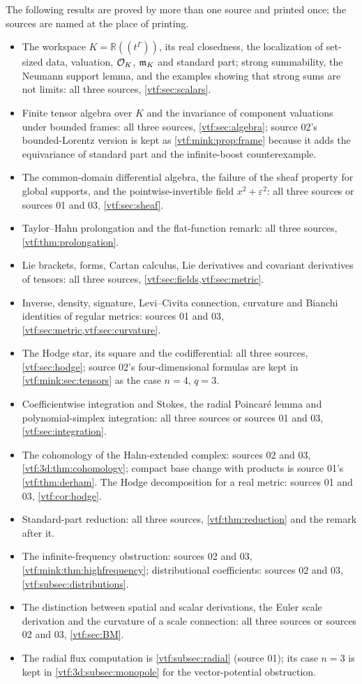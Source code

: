 \documentclass[11pt,letterpaper]{article}
\theoremstyle{definition}
\theoremstyle{remark}
\newcommand{\R}{\mathbb R}\newcommand{\C}{\mathbb C}
\newcommand{\eps}{\varepsilon}
\begin{document}
The following results are proved by more than one source and printed once; the
sources are named at the place of printing.
\begin{itemize}
\item The workspace $K=\R((t^\Gamma))$, its real closedness, the localization of
set-sized data, valuation, $\mathcal O_K$, $\mathfrak m_K$ and standard part; strong
summability, the Neumann support lemma, and the examples showing that strong
sums are not limits: all three sources, \cref{vtf:sec:scalars}.
\item Finite tensor algebra over $K$ and the invariance of component valuations
under bounded frames: all three sources, \cref{vtf:sec:algebra}; source 02's
bounded-Lorentz version is kept as \cref{vtf:mink:prop:frame} because it adds the
equivariance of standard part and the infinite-boost counterexample.
\item The common-domain differential algebra, the failure of the sheaf property
for global supports, and the pointwise-invertible field $x^2+\eps^2$: all three
sources or sources 01 and 03, \cref{vtf:sec:sheaf}.
\item Taylor--Hahn prolongation and the flat-function remark: all three sources,
\cref{vtf:thm:prolongation}.
\item Lie brackets, forms, Cartan calculus, Lie derivatives and covariant
derivatives of tensors: all three sources, \cref{vtf:sec:fields,vtf:sec:metric}.
\item Inverse, density, signature, Levi--Civita connection, curvature and
Bianchi identities of regular metrics: sources 01 and 03, \cref{vtf:sec:metric,vtf:sec:curvature}.
\item The Hodge star, its square and the codifferential: all three sources,
\cref{vtf:sec:hodge}; source 02's four-dimensional formulas are kept in
\cref{vtf:mink:sec:tensors} as the case $n=4$, $q=3$.
\item Coefficientwise integration and Stokes, the radial Poincar\'e lemma and
polynomial-simplex integration: all three sources or sources 01 and 03,
\cref{vtf:sec:integration}.
\item The cohomology of the Hahn-extended complex: sources 02 and 03,
\cref{vtf:3d:thm:cohomology}; compact base change with products is source 01's
\cref{vtf:thm:derham}. The Hodge decomposition for a real metric: sources 01
and 03, \cref{vtf:cor:hodge}.
\item Standard-part reduction: all three sources, \cref{vtf:thm:reduction} and
the remark after it.
\item The infinite-frequency obstruction: sources 02 and 03,
\cref{vtf:mink:thm:highfrequency}; distributional coefficients: sources 02 and
03, \cref{vtf:subsec:distributions}.
\item The distinction between spatial and scalar derivations, the Euler scale
derivation and the curvature of a scale connection: all three sources or sources
02 and 03, \cref{vtf:sec:BM}.
\item The radial flux computation is \cref{vtf:subsec:radial} (source 01); its
case $n=3$ is kept in \cref{vtf:3d:subsec:monopole} for the vector-potential
obstruction.
\end{itemize}
\end{document}
